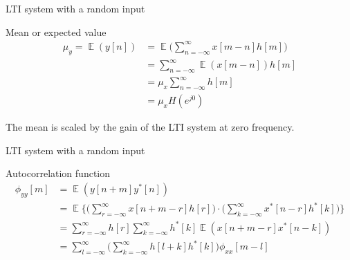 \documentclass[10pt, handout]{beamer}
\DeclareMathOperator{\E}{\mathbb{E}} %
\begin{document}
%
\begin{frame}{LTI system with a random input}

\begin{block}{Mean or expected value}
	\begin{align*}
	\mu_y = \E(y[n]) &= \E\bigg(\sum_{n=-\infty}^{\infty} x[m-n]h[m]\bigg) \\
	&= \sum_{n=-\infty}^{\infty} \E(x[m-n])h[m] \tag{Expectation is a linear operator and $h[n]$ is not random} \\
	&= \mu_x\sum_{n=-\infty}^{\infty} h[m] \tag{Assuming $x[n]$ is WSS} \\
	&= \mu_xH(e^{j0})
	\end{align*}
\end{block}

The mean is scaled by the gain of the LTI system at zero frequency.
\end{frame}

\begin{frame}{LTI system with a random input}

\begin{block}{Autocorrelation function}
	\begin{align} \nonumber
	\phi_{yy}[m] &= \E(y[n+m]y^*[n]) \tag{by definition}  \\ \nonumber
	&= \E\bigg\lbrace\bigg(\sum_{r=-\infty}^{\infty} x[n+m-r]h[r]\bigg)\cdot\bigg(\sum_{k=-\infty}^{\infty} x^*[n-r]h^*[k]\bigg)\bigg\rbrace  \\ \nonumber
	&= \sum_{r=-\infty}^{\infty} h[r] \sum_{k=-\infty}^{\infty} h^*[k]\E(x[n+m-r]x^*[n-k]) \\
	&= \sum_{l=-\infty}^{\infty} \bigg(\sum_{k=-\infty}^{\infty} h[l+k]h^*[k]\bigg)\phi_{xx}[m-l] \tag{change variables $r = l+k$}
	\end{align}
\end{block}
\end{frame}
\end{document}
